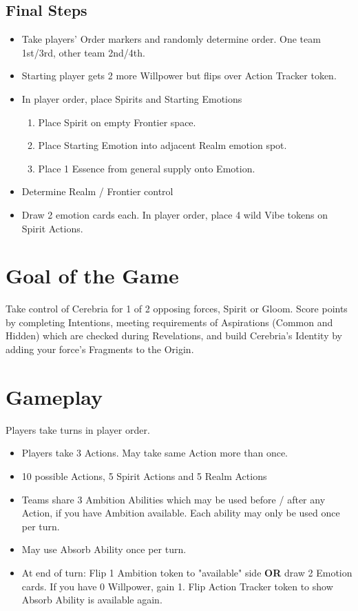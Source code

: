 \documentclass[10pt]{article}
\newenvironment{enumerateCustom}
{\begin{enumerate}
  \setlength{\itemsep}{1pt}
  \setlength{\parskip}{0pt}
  \setlength{\parsep}{0pt}}
{\end{enumerate}}
\newenvironment{itemizeCustom}
{\begin{itemize}
  \setlength{\itemsep}{1pt}
  \setlength{\parskip}{0pt}
  \setlength{\parsep}{0pt}}
{\end{itemize}}
\begin{document}
\begin{multicols*}{2}
\subsection*{Final Steps}
\begin{itemizeCustom}
    \item Take players' Order markers and randomly determine order. One team 1st/3rd, other team 2nd/4th.
    \item Starting player gets 2 more Willpower but flips over Action Tracker token.
    \item In player order, place Spirits and Starting Emotions
        \begin{enumerateCustom}
            \item Place Spirit on empty Frontier space.
            \item Place Starting Emotion into adjacent Realm emotion spot.
            \item Place 1 Essence from general supply onto Emotion.
        \end{enumerateCustom}
    \item Determine Realm / Frontier control
    \item Draw 2 emotion cards each. In player order, place 4 wild Vibe tokens on Spirit Actions.
\end{itemizeCustom}

\section*{Goal of the Game}
    Take control of Cerebria for 1 of 2 opposing forces, Spirit or Gloom. Score points by completing Intentions, meeting requirements of Aspirations (Common and Hidden) which are checked during Revelations, and build Cerebria's Identity by adding your force's Fragments to the Origin.

\section*{Gameplay}
Players take turns in player order.

\begin{itemizeCustom}
    \item Players take 3 Actions. May take same Action more than once.
    \item 10 possible Actions, 5 Spirit Actions and 5 Realm Actions
    \item Teams share 3 Ambition Abilities which may be used before / after any Action, if you have Ambition available. Each ability may only be used once per turn.
    \item May use Absorb Ability once per turn.
    \item At end of turn: Flip 1 Ambition token to "available" side \textbf{OR} draw 2 Emotion cards. If you have 0 Willpower, gain 1. Flip Action Tracker token to show Absorb Ability is available again.
\end{itemizeCustom}


\end{multicols*}
\end{document}
